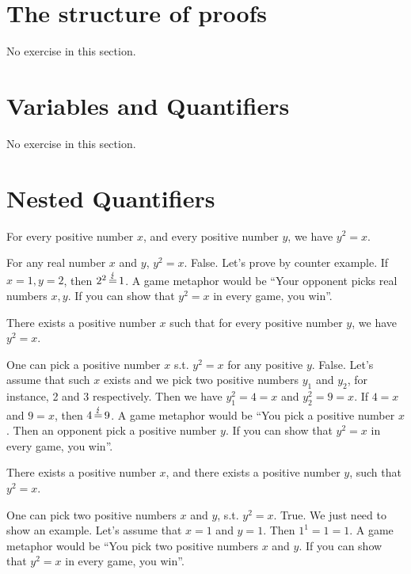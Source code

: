 \section{The structure of proofs}
No exercise in this section.
\section{Variables and Quantifiers}
No exercise in this section.
\section{Nested Quantifiers}
\setcounter{exercise}{0}
\begin{subexercises}
    \begin{exercise}
        For every positive number $x$, and every positive number $y$, we have $y^2 =x$.
    \end{exercise}
    \begin{solution}
        For any real number $x$ and $y$, $y^2=x$. False. Let's prove by counter example. If $x=1, y=2$, then $2^2\operatorname{\stackrel{\lightning}{=}}1$. A game metaphor would be ``Your opponent picks real numbers $x, y$. If you can show that $y^2=x$ in every game, you win''.
    \end{solution}

    \begin{exercise}
        There exists a positive number $x$ such that for every positive number $y$, we have $y^2 = x$.
    \end{exercise}
    \begin{solution}
        One can pick a positive number $x$ s.t. $y^2=x$ for any positive $y$. False. Let's assume that such $x$ exists and we pick two positive numbers $y_1$ and $y_2$, for instance, 2 and 3 respectively. Then we have $y_1^2=4=x$ and $y_2^2=9=x$. If $4=x$ and $9=x$, then $4\operatorname{\stackrel{\lightning}{=}}9$. A game metaphor would be ``You pick a positive number $x$. Then an opponent pick a positive number $y$. If you can show that $y^2=x$ in every game, you win''.
    \end{solution}


    \begin{exercise}
        There exists a positive number $x$, and there exists a positive number $y$, such that $y^2 = x$.
    \end{exercise}
    \begin{solution}
        One can pick two positive numbers $x$ and $y$, s.t. $y^2=x$. True. We just need to show an example. Let's assume that $x=1$ and $y=1$. Then $1^1=1=1$. A game metaphor would be ``You pick two positive numbers $x$ and $y$. If you can show that $y^2=x$ in every game, you win''.
    \end{solution}


\end{subexercises}
